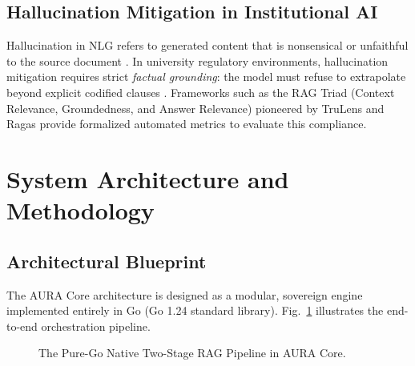 \documentclass[conference]{IEEEtran}
\begin{document}
\subsection{Hallucination Mitigation in Institutional AI}
Hallucination in NLG refers to generated content that is nonsensical or unfaithful to the source document \cite{ji2023survey, shuster2021retrieval}. In university regulatory environments, hallucination mitigation requires strict \textit{factual grounding}: the model must refuse to extrapolate beyond explicit codified clauses \cite{asai2023self}. Frameworks such as the RAG Triad (Context Relevance, Groundedness, and Answer Relevance) pioneered by TruLens \cite{saad2023trulens} and Ragas \cite{es2023ragas} provide formalized automated metrics to evaluate this compliance.

\section{System Architecture and Methodology}

\subsection{Architectural Blueprint}
The AURA Core architecture is designed as a modular, sovereign engine implemented entirely in Go (Go 1.24 standard library). Fig.~\ref{fig:architecture} illustrates the end-to-end orchestration pipeline.

\begin{figure}[htbp]
\centerline{}
\caption{The Pure-Go Native Two-Stage RAG Pipeline in AURA Core.}
\label{fig:architecture}
\end{figure}
\end{document}
